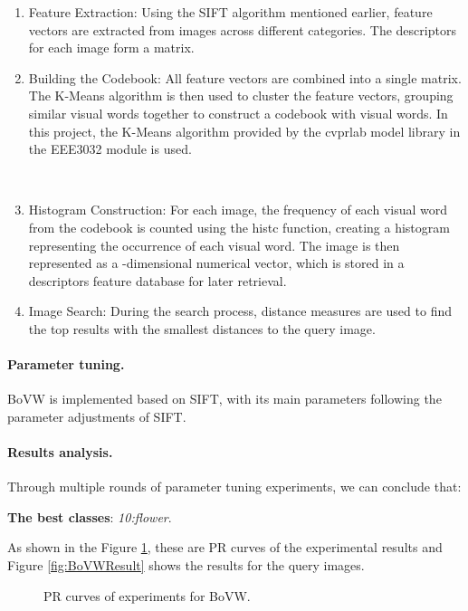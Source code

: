 \documentclass{article}
\begin{document}
\begin{enumerate}

\item Feature Extraction: Using the SIFT algorithm mentioned earlier, feature vectors are extracted from images across different categories. The descriptors for each image form a matrix.

\item ​Building the Codebook: All feature vectors are combined into a single matrix. The K-Means algorithm is then used to cluster the feature vectors, grouping similar visual words together to construct a codebook with visual words. In this project, the K-Means algorithm provided by the cvprlab model library in the EEE3032 module is used.

​\item Histogram Construction: For each image, the frequency of each visual word from the codebook is counted using the histc function, creating a histogram representing the occurrence of each visual word. The image is then represented as a -dimensional numerical vector, which is stored in a descriptors feature database for later retrieval.

\item Image Search: During the search process, distance measures are used to find the top results with the smallest distances to the query image.
\end{enumerate}

\paragraph{Parameter tuning.}
BoVW is implemented based on SIFT, with its main parameters following the parameter adjustments of SIFT.

\paragraph{Results analysis.}
Through multiple rounds of parameter tuning experiments, we can conclude that:

\noindent \textbf{The best classes}: \textit{10:flower}.


As shown in the Figure \ref{fig:BoVWPR}, these are PR curves of the experimental results and Figure \ref{fig:BoVWResult} shows the results for the query images.

\begin{figure}[!tbp]
  \centering
  \hfill
  \hfill
  \caption{\label{fig:BoVWPR} PR curves of experiments for BoVW.}
\end{figure}
\end{document}
